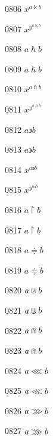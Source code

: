 \documentclass{article}
\begin{document}
0806 $x^{a\Bbbk b}$\par
0807 $x^{y^{a\Bbbk b}}$\par
0808 $a\hslash b$\par
0809 $\displaystyle a\hslash b$\par
0810 $x^{a\hslash b}$\par
0811 $x^{y^{a\hslash b}}$\par
0812 $a\backepsilon b$\par
0813 $\displaystyle a\backepsilon b$\par
0814 $x^{a\backepsilon b}$\par
0815 $x^{y^{a\backepsilon b}}$\par
0816 $a\restriction b$\par
0817 $\displaystyle a\restriction b$\par
0818 $a\Doteq b$\par
0819 $\displaystyle a\Doteq b$\par
0820 $a\doublecup b$\par
0821 $\displaystyle a\doublecup b$\par
0822 $a\doublecap b$\par
0823 $\displaystyle a\doublecap b$\par
0824 $a\llless b$\par
0825 $\displaystyle a\llless b$\par
0826 $a\gggtr b$\par
0827 $\displaystyle a\gggtr b$\par
\end{document}
